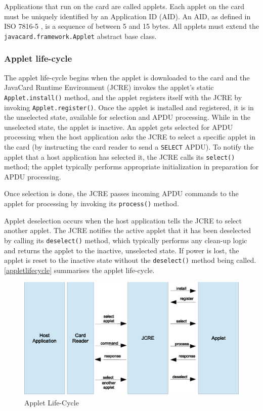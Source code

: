 \documentclass[12pt,a4paper,twoside,openright]{report}
\begin{document}
Applications that run on the card are called applets. Each applet on the card must be uniquely identified by an Application ID (AID). An AID, as defined in ISO 7816-5 \cite{ISO78165}, is a sequence of between 5 and 15 bytes. All applets must extend the \texttt{javacard.framework.Applet} abstract base class.

\subsubsection{Applet life-cycle}

The applet life-cycle begins when the applet is downloaded to the card and the JavaCard Runtime Environment (JCRE) invokes the applet's static \texttt{Applet.install()} method, and the applet registers itself with the JCRE by invoking \texttt{Applet.register()}. Once the applet is installed and registered, it is in the unselected state, available for selection and APDU processing. While in the unselected state, the applet is inactive. An applet gets selected for APDU processing when the host application asks the JCRE to select a specific applet in the card (by instructing the card reader to send a \texttt{SELECT} APDU). To notify the applet that a host application has selected it, the JCRE calls its \texttt{select()} method; the applet typically performs appropriate initialization in preparation for APDU processing.

Once selection is done, the JCRE passes incoming APDU commands to the applet for processing by invoking its \texttt{process()} method.

Applet deselection occurs when the host application tells the JCRE to select another applet. The JCRE notifies the active applet that it has been deselected by calling its \texttt{deselect()} method, which typically performs any clean-up logic and returns the applet to the inactive, unselected state. If power is lost, the applet is reset to the inactive state without the \texttt{deselect()} method being called. \autoref{appletlifecycle} summarises the applet life-cycle.

\begin{figure}[tbh]
\centerline{\includegraphics{figures/appletlifecycle.eps}}
\caption{Applet Life-Cycle}
\label{appletlifecycle}
\end{figure}
\end{document}
